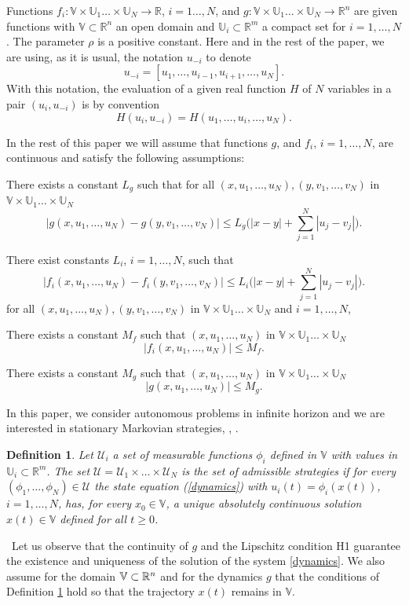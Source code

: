 \documentclass[12pt]{article}
\newtheorem{definition}{Definition}
\newcounter{remark}
\def\theremark {\arabic{remark}}
\newenvironment{remark}{\refstepcounter{remark}\par\noindent{\bf Remark\ \theremark}\ }{\par}
\begin{document}
Functions $f_i:\mathbb{V}\times\mathbb{U}_1\dots\times\mathbb{U}_N\longrightarrow \mathbb{R}$, $i=1\dots, N$, and  $g:\mathbb{V}\times\mathbb{U}_1\dots\times\mathbb{U}_N\longrightarrow\mathbb{R}^n$ are given functions with
$\mathbb{V}\subset\mathbb{R}^n$ an open domain and $\mathbb{U}_i\subset\mathbb{R}^m$ a {compact}  set for $i=1,\dots, N$.
The parameter $\rho$ is a positive constant.
Here and in the rest of the paper, we are using, as it is usual, the  notation $u_{-i}$ to denote
$$u_{-i}=[u_1,\dots,u_{i-1},u_{i+1},\dots,u_N].$$
 With this notation, the evaluation of a given real function $H$ of $N$ variables in a pair $(u_i,u_{-i})$ is by convention
$$H(u_i,u_{-i})=H(u_1,\dots,u_i,\dots,u_N).$$

In the rest of this paper we will assume that functions $g$, and $f_i$, $i=1,\dots,N$, are continuous and satisfy the following assumptions:
\begin{enumerate}
\item[H1] There exists a constant $L_g$ such that for all $(x,u_1,\dots,u_N), (y,v_1,\dots,v_N)$ in $\mathbb{V}\times\mathbb{U}_1\dots\times\mathbb{U}_N$ \label{H1}
    $$
    |g(x,u_1,\dots,u_N)-g(y,v_1,\dots,v_N)|\le L_g\bigl(|x-y|+\sum_{j=1}^N|u_j-v_j|\bigr).$$
\item[H2] There exist constants $L_i$, $i=1,\dots,N$, such that
    $$
    |f_i(x,u_1,\dots,u_N)-f_i(y,v_1,\dots,v_N)|\le L_i\bigl(|x-y|+\sum_{j=1}^N|u_j-v_j|\bigr).
    $$
for all $(x,u_1,\dots,u_N), (y,v_1,\dots,v_N)$ in $\mathbb{V}\times\mathbb{U}_1\dots\times\mathbb{U}_N$ and $i=1,\dots, N$,
\item[H3] There exists a constant $M_f$ such that $(x,u_1,\dots,u_N)$ in $\mathbb{V}\times\mathbb{U}_1\dots\times\mathbb{U}_N$
$$|f_i(x,u_1,\dots,u_N)|\le M_f.$${
\item[H4] There exists a constant $M_g$ such that $(x,u_1,\dots,u_N)$ in $\mathbb{V}\times\mathbb{U}_1\dots\times\mathbb{U}_N$
$$|g(x,u_1,\dots,u_N)|\le M_g.$$}
\end{enumerate}


In this paper, we consider autonomous problems in infinite horizon and we are interested in stationary Markovian strategies, \cite{Basar}, \cite{Dockner}.
\begin{definition}\label{markovian_strategies}
Let $\mathcal{U}_i$  a set of measurable functions $\phi_i$ defined in $\mathbb{V}$ with values in  $\mathbb{U}_i\subset\mathbb{R}^m$. The set $\mathcal{U}=\mathcal{U}_1\times\dots\times\mathcal{U}_N$ is the set of admissible strategies if for every $(\phi_1,\dots,\phi_N)\in\mathcal{U}$ the state equation (\ref{dynamics}) with $u_i(t)=\phi_i(x(t))$, $i=1,\dots, N$, has, for every $x_0\in\mathbb{V}$, a unique absolutely continuous solution  $x(t)\in\mathbb{V}$ defined for all $t\ge 0$.
\end{definition}{
\begin{remark}Let us observe that the continuity of $g$ and the Lipschitz condition H1 guarantee the existence and uniqueness of the solution of the system \eqref{dynamics}.
We also assume for the domain $\mathbb{V}\subset {\Bbb R}^n$ and for the dynamics $g$ that the conditions of Definition \ref{markovian_strategies} hold so that the trajectory
$x(t)$ remains in $\mathbb{V}$. 
\end{remark}}
\end{document}
